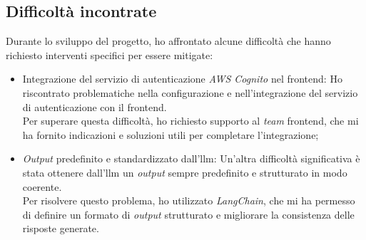 \subsection{Difficoltà incontrate}
\label{subsec:difficolta-incontrate}
Durante lo sviluppo del progetto, ho affrontato alcune difficoltà che hanno richiesto interventi specifici per essere mitigate:

\begin{itemize}
\item Integrazione del servizio di autenticazione \textit{AWS Cognito} nel \gls{frontend}: Ho riscontrato problematiche nella configurazione e nell'integrazione del servizio di autenticazione  con il \gls{frontend}.\\
Per superare questa difficoltà, ho richiesto supporto al \textit{team} \gls{frontend}, che mi ha fornito indicazioni e soluzioni utili per completare l'integrazione;

\item \textit{Output} predefinito e standardizzato dall'\gls{llm}: Un'altra difficoltà significativa è stata ottenere dall'\gls{llm} un \textit{output} sempre predefinito e strutturato in modo coerente.  \\    
Per risolvere questo problema, ho utilizzato \textit{LangChain}, che mi ha permesso di definire un formato di \textit{output} strutturato e migliorare la consistenza delle risposte generate.
\end{itemize}